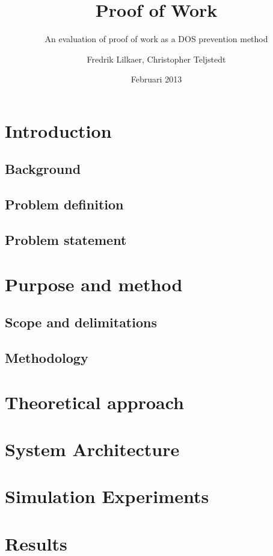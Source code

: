 \documentclass[a4paper,11pt]{kth-mag}
\title{Proof of Work}
\subtitle{An evaluation of proof of work as a DOS prevention method}
\author{Fredrik Lilkaer, Christopher Teljstedt}
\date{Februari 2013}
\begin{document}
\removepagenumbers
\maketitle
{}
\section{Introduction}

\subsection{Background}

\subsection{Problem definition}

\subsection{Problem statement} %

\section{Purpose and method}

\subsection{Scope and delimitations}

\subsection{Methodology}


\section{Theoretical approach}

\section{System Architecture}

\section{Simulation Experiments}

\section{Results}

\end{document}
